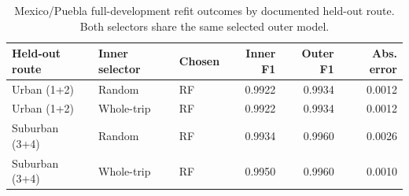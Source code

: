 \begin{table}[p]
\centering
\begin{singlespace}
\small
\caption{Mexico/Puebla full-development refit outcomes by documented held-out route. Both selectors share the same selected outer model.}\label{tab:mexico}
\begin{tabularx}{\linewidth}{lXlrrr}
\toprule
Held-out route & Inner selector & Chosen & Inner F1 & Outer F1 & Abs. error \\
\midrule
Urban (1+2) & Random & RF & 0.9922 & 0.9934 & 0.0012 \\
Urban (1+2) & Whole-trip & RF & 0.9922 & 0.9934 & 0.0012 \\
\midrule
Suburban (3+4) & Random & RF & 0.9934 & 0.9960 & 0.0026 \\
Suburban (3+4) & Whole-trip & RF & 0.9950 & 0.9960 & 0.0010 \\
\bottomrule\end{tabularx}
\end{singlespace}
\end{table}
